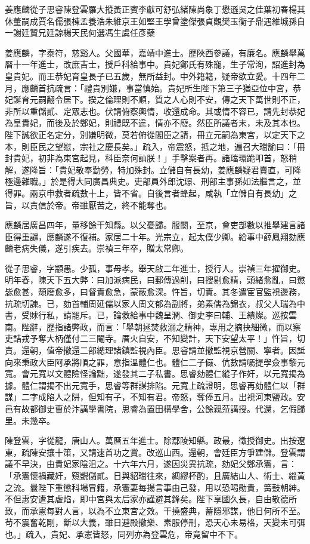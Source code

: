 
\begin{pinyinscope}
姜應麟從子思睿陳登雲羅大摐黃正賓李獻可舒弘緒陳尚象丁懋遜吳之佳葉初春楊其休董嗣成賈名儒張棟孟養浩朱維京王如堅王學曾塗傑張貞觀樊玉衡子鼎遇維城孫自一謝廷贊兄廷諒楊天民何選馮生虞任彥蘗

姜應麟，字泰符，慈谿人。父國華，嘉靖中進士。歷陜西參議，有廉名。應麟舉萬曆十一年進士，改庶吉士，授戶科給事中。貴妃鄭氏有殊寵，生子常洵，詔進封為皇貴妃。而王恭妃育皇長子已五歲，無所益封。中外籍籍，疑帝欲立愛。十四年二月，應麟首抗疏言：「禮貴別嫌，事當慎始。貴妃所生陛下第三子猶亞位中宮，恭妃誕育元嗣翻令居下。揆之倫理則不順，質之人心則不安，傳之天下萬世則不正，非所以重儲貳、定眾志也。伏請俯察輿情，收還成命。其或情不容已，請先封恭妃為皇貴妃，而後及於鄭妃，則禮既不違，情亦不廢。然臣所議者末，未及其本也。陛下誠欲正名定分，別嫌明微，莫若俯從閣臣之請，冊立元嗣為東宮，以定天下之本，則臣民之望慰，宗社之慶長矣。」疏入，帝震怒，抵之地，遍召大璫諭曰：「冊封貴妃，初非為東宮起見，科臣奈何訕朕！」手擊案者再。諸璫環跪叩首，怒稍解，遂降旨：「貴妃敬奉勤勞，特加殊封。立儲自有長幼，姜應麟疑君賣直，可降極邊雜職。」於是得大同廣昌典史。吏部員外郎沈璟、刑部主事孫如法繼言之，並得罪。兩京申救者疏數十上，皆不省。自後言者蜂起，咸執「立儲自有長幼」之旨，以責信於帝。帝雖厭苦之，終不能奪也。

應麟居廣昌四年，量移餘干知縣。以父憂歸。服闋，至京，會吏部數以推舉建言諸臣得重譴，應麟遂不復補。家居二十年。光宗立，起太僕少卿。給事中薛鳳翔劾應麟老病失儀，遂引疾去。崇禎三年卒，贈太常卿。

從子思睿，字顓愚。少孤，事母孝。舉天啟二年進士，授行人。崇禎三年擢御史。明年春，陳天下五大弊：曰加派病民，曰郵傳過削，曰搜剔愈精，頭緒愈亂，曰懲毖愈甚，頹廢愈多，曰督責愈急，蒙蔽愈深。忤旨，切責。其冬遣宦官監視邊務，抗疏切諫。已，劾首輔周延儒以家人周文郁為副將，弟素儒為錦衣，叔父人瑞為中書，受賕行私，請罷斥。已，論救給事中魏呈潤、御史李曰輔、王績燦。巡按雲南。陛辭，歷指諸弊政，而言：「舉朝拯焚救溺之精神，專用之摘抉細微，而以察吏詰戎予奪大柄僅付二三閹寺。厝火自安，不知變計，天下安望太平！」忤旨，切責。還朝，值帝撤還二部總理諸鎮監視內臣。思睿請並撤監視京營關、寧者。因詆向來秉政大臣阿承將順之罪，意指溫體仁也。體仁二子儼、伉數請囑提學僉事黎元寬。會元寬以文體險怪論黜，遂發其二子私書。思睿劾體仁縱子作奸，以元寬揭為據。體仁謂揭不出元寬手，思睿等群謀排陷。元寬上疏證明，思睿再劾體仁以「群謀」二字成陷人之阱，但知有子，不知有君。帝怒，奪俸五月。出視河東鹽政。安邑有故都御史曹於汴講學書院，思睿為置田構學舍，公餘親蒞講授。代還，乞假歸里。未幾卒。

陳登雲，字從龍，唐山人。萬曆五年進士。除鄢陵知縣。政最，徵授御史。出按遼東，疏陳安攘十策，又請速首功之賞。改巡山西。還朝，會廷臣方爭建儲。登雲謂議不早決，由貴妃家陰沮之。十六年六月，遂因災異抗疏，劾妃父鄭承憲，言：「承憲懷禍藏奸，窺覬儲貳。日與貂璫往來，綢繆杯酌，且廣結山人、術士、緇黃之流。曩陛下重懲科場冒籍，承憲妻每揚言事由己發，用以恐喝勛貴，簧鼓朝紳。不但惠安遭其虐焰，即中宮與太后家亦謹避其鋒矣。陛下享國久長，自由敬德所致，而承憲每對人言，以為不立東宮之效。干撓盛典，蓄隱邪謀，他日何所不至。茍不震奮乾剛，斷以大義，雖日避殿撤樂、素服停刑，恐天心未易格，天變未可弭也。」疏入，貴妃、承憲皆怒，同列亦為登雲危，帝竟留中不下。


\end{pinyinscope}
